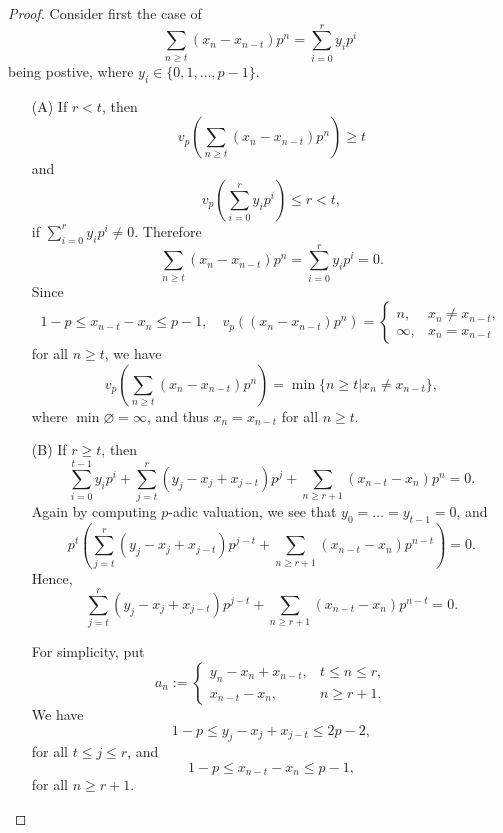 \documentclass{article}
\theoremstyle{definition}
\theoremstyle{remark}
\begin{document}
\begin{proof}
Consider first the case of \begin{equation}\label{sum x p eq sum y p}
    \sum_{n\ge t}(x_n-x_{n-t})p^n = \sum_{i=0}^r y_ip^i
\end{equation} being postive, where $y_i\in\{0, 1, \dots, p-1\}$.
\begin{enumerate}
    \item [(A)]
    If $r < t$, then \[v_p\left( \sum_{n\ge t}(x_n-x_{n-t})p^n \right)\ge t\]
    and $$v_p\left(\sum_{i=0}^r y_ip^i\right)\le r < t,$$
    if $\sum_{i=0}^r y_ip^i\ne 0$. Therefore \[\sum_{n\ge t}(x_n-x_{n-t})p^n = \sum_{i=0}^r y_ip^i = 0.\]
    Since \[1-p\le x_{n-t}-x_n\le p-1,\quad 
    v_p\left((x_n-x_{n-t})p^n\right) = \begin{cases}
        n, & x_n \ne x_{n-t},\\
        \infty, & x_n = x_{n-t}
    \end{cases}\] for all $n \ge t$,
    we have \[v_p\left( \sum_{n\ge t}(x_n-x_{n-t})p^n \right) = \min \{n\ge t | x_n \ne x_{n-t}\},\] where $\min\varnothing = \infty$, and thus $x_n = x_{n-t}$ for all $n\ge t$.

    \item [(B)]
    If $r \ge t$,
    then \[\sum_{i=0}^{t-1} y_ip^i + \sum_{j=t}^r (y_j - x_j + x_{j-t})p^j + \sum_{n\ge r + 1}(x_{n-t} - x_n)p^n = 0.\]
    Again by computing $p$-adic valuation, we see that $y_0 =  \dots = y_{t-1} = 0$, and
    \[p^t\left(\sum_{j=t}^r (y_j - x_j + x_{j-t})p^{j-t} + \sum_{n\ge r + 1}(x_{n-t} - x_n)p^{n-t}\right) = 0.\]
    Hence,\begin{equation}\label{eq when r ge t}
        \sum_{j=t}^r (y_j - x_j + x_{j-t})p^{j-t} + \sum_{n\ge r + 1}(x_{n-t} - x_n)p^{n-t} = 0.
    \end{equation}

    For simplicity, put \[a_n := \begin{cases}
        y_n - x_n + x_{n-t}, & t\le n\le r,\\
        x_{n-t} - x_n, & n\ge r + 1.
    \end{cases}\]
    We have \[1-p\le y_j-x_j +x_{j-t}\le 2p-2,
    \]for all $t\le j\le r$, and
    \[1-p\le x_{n-t}-x_n\le p-1,
    \] for all $n \ge r+1$.
    


\end{enumerate}
\end{proof}
\end{document}
